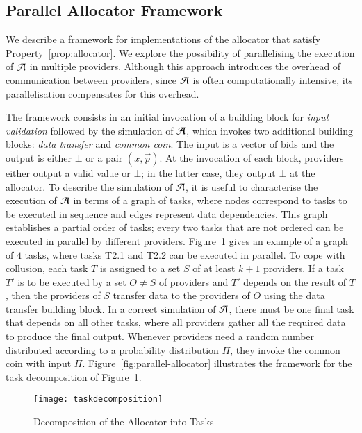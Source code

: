 \subsection{Parallel Allocator Framework}
\label{sec:implementation}

We describe a framework for implementations of
the allocator that satisfy Property~\ref{prop:allocator}.
We explore the possibility of parallelising the execution of $\mathcal{A}$ in multiple providers.
Although this approach introduces the overhead of communication between providers,
since $\mathcal{A}$ is often computationally intensive,
its parallelisation compensates for this overhead.

The framework consists in an initial invocation of a 
building block for \emph{input validation} followed
by the simulation of $\mathcal{A}$, which invokes two additional building blocks:
\emph{data transfer} and \emph{common coin}.
The input is a vector of bids and the output is either $\bot$ or a pair $(x,\vec{p})$.
At the invocation of each block, providers either output a valid value
or $\bot$; in the latter case, they output $\bot$ at the allocator.
To describe the simulation of $\mathcal{A}$,
it is useful to characterise the execution of $\mathcal{A}$
in terms of a graph of tasks, where nodes correspond to
tasks to be executed in sequence and edges 
represent data dependencies. This graph establishes a partial order
of tasks; every two tasks that are not ordered can be executed in parallel
by different providers. Figure~\ref{fig:taskdecomposition}
gives an example of a graph of $4$ tasks,
where tasks T2.1 and T2.2 can be executed in parallel.
To cope with collusion, each task $T$ is assigned to a set $S$ of at least $k+1$ providers.
If a task $T'$ is to be executed by a set $O \neq S$ of providers and $T'$ depends on
the result of $T$, then the providers of $S$ transfer data to the providers of $O$
using the data transfer building block. In a correct simulation of $\mathcal{A}$,
there must be one final task that depends on all other tasks,
where all providers gather all the required data to produce the final output.
Whenever providers need a random number distributed according to a 
probability distribution $\Pi$, they invoke the common coin with input $\Pi$.
Figure~\ref{fig:parallel-allocator} illustrates the framework
for the task decomposition of Figure~\ref{fig:taskdecomposition}.

\begin{figure}[tbp]
	\centering
	\texttt{[image: taskdecomposition]}
	\caption{Decomposition of the Allocator into Tasks}
	\label{fig:taskdecomposition}
\end{figure}

